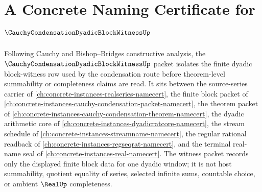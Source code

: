 \chapter{A Concrete Naming Certificate for $\CauchyCondensationDyadicBlockWitnessUp$}
\label{ch:concrete-instances-cauchy-condensation-dyadic-block-witness-namecert}

Following Cauchy and Bishop--Bridges constructive analysis, the $\CauchyCondensationDyadicBlockWitnessUp$ packet isolates the finite dyadic block-witness row used by the condensation route before theorem-level summability or completeness claims are read. It sits between the source-series carrier of \autoref{ch:concrete-instances-realseries-namecert}, the finite block packet of \autoref{ch:concrete-instances-cauchy-condensation-packet-namecert}, the theorem packet of \autoref{ch:concrete-instances-cauchy-condensation-theorem-namecert}, the dyadic arithmetic core of \autoref{ch:concrete-instances-dyadicratcore-namecert}, the stream schedule of \autoref{ch:concrete-instances-streamname-namecert}, the regular rational readback of \autoref{ch:concrete-instances-regseqrat-namecert}, and the terminal real-name seal of \autoref{ch:concrete-instances-real-namecert}. The witness packet records only the displayed finite block data for one dyadic window; it is not host summability, quotient equality of series, selected infinite sums, countable choice, or ambient $\RealUp$ completeness.

